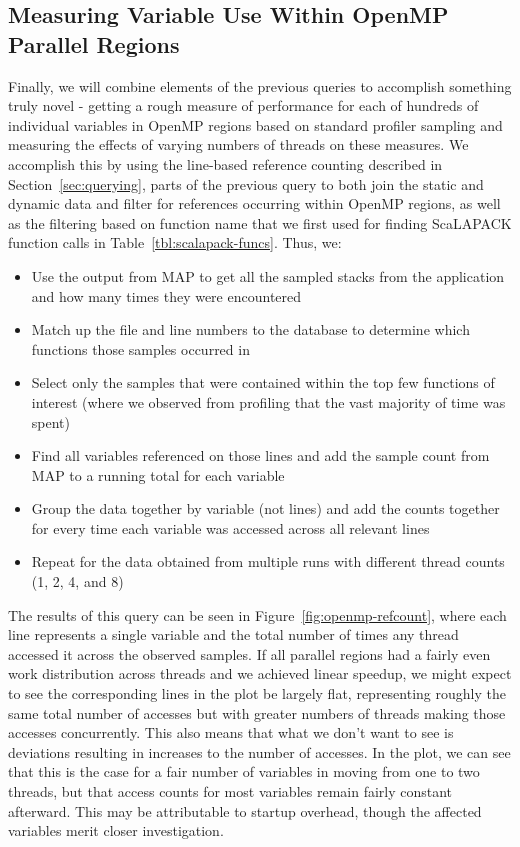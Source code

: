 \subsection{Measuring Variable Use Within OpenMP Parallel Regions}

Finally, we will combine elements of the previous queries to accomplish something truly novel - getting a rough measure of performance for each of hundreds of individual variables in OpenMP regions based on standard profiler sampling and measuring the effects of varying numbers of threads on these measures.
We accomplish this by using the line-based reference counting described in Section~\ref{sec:querying}, parts of the previous query to both join the static and dynamic data and filter for references occurring within OpenMP regions, as well as the filtering based on function name that we first used for finding ScaLAPACK function calls in Table~\ref{tbl:scalapack-funcs}.
Thus, we:
\begin{itemize}
\item Use the output from MAP to get all the sampled stacks from the application and how many times they were encountered
\item Match up the file and line numbers to the database to determine which functions those samples occurred in
\item Select only the samples that were contained within the top few functions of interest (where we observed from profiling that the vast majority of time was spent)
\item Find all variables referenced on those lines and add the sample count from MAP to a running total for each variable
\item Group the data together by variable (not lines) and add the counts together for every time each variable was accessed across all relevant lines
\item Repeat for the data obtained from multiple runs with different thread counts (1, 2, 4, and 8)
\end{itemize}
The results of this query can be seen in Figure~\ref{fig:openmp-refcount}, where each line represents a single variable and the total number of times any thread accessed it across the observed samples.
If all parallel regions had a fairly even work distribution across threads and we achieved linear speedup, we might expect to see the corresponding lines in the plot be largely flat, representing roughly the same total number of accesses but with greater numbers of threads making those accesses concurrently.
This also means that what we don't want to see is deviations resulting in increases to the number of accesses.
In the plot, we can see that this is the case for a fair number of variables in moving from one to two threads, but that access counts for most variables remain fairly constant afterward.
This may be attributable to startup overhead, though the affected variables merit closer investigation.

